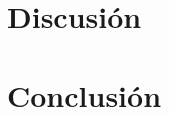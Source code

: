 \documentclass[spanish, 10pt,a4paper]{article}
\numberwithin{equation}{section} %
\begin{document}
\section{Discusión}
	
\section{Conclusión}

\end{document}
